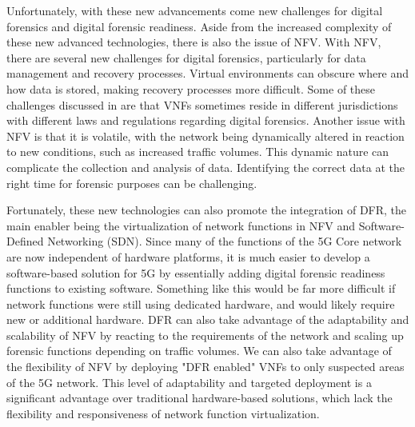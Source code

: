 \documentclass[final,1p,times,authoryear]{elsarticle}
\begin{document}
Unfortunately, with these new advancements come new challenges for digital forensics and digital forensic readiness. Aside from the increased complexity of these new advanced technologies, there is also the issue of NFV. With NFV, there are several new challenges for digital forensics, particularly for data management and recovery processes. Virtual environments can obscure where and how data is stored, making recovery processes more difficult. Some of these challenges discussed in \citep{sharevski2018towards} are that VNFs sometimes reside in different jurisdictions with different laws and regulations regarding digital forensics. Another issue with NFV is that it is volatile, with the network being dynamically altered in reaction to new conditions, such as increased traffic volumes. This dynamic nature can complicate the collection and analysis of data. Identifying the correct data at the right time for forensic purposes can be challenging.

\vspace{1em}

Fortunately, these new technologies can also promote the integration of DFR, the main enabler being the virtualization of network functions in NFV and Software-Defined Networking (SDN). Since many of the functions of the 5G Core network are now independent of hardware platforms, it is much easier to develop a software-based solution for 5G by essentially adding digital forensic readiness functions to existing software. Something like this would be far more difficult if network functions were still using dedicated hardware, and would likely require new or additional hardware. DFR can also take advantage of the adaptability and scalability of NFV by reacting to the requirements of the network and scaling up forensic functions depending on traffic volumes. We can also take advantage of the flexibility of NFV by deploying "DFR enabled" VNFs to only suspected areas of the 5G network. This level of adaptability and targeted deployment is a significant advantage over traditional hardware-based solutions, which lack the flexibility and responsiveness of network function virtualization.

\end{document}
